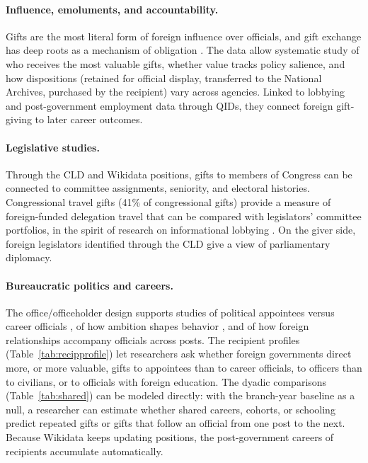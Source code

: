\documentclass[11pt]{article}
\begin{document}
\paragraph{Influence, emoluments, and accountability.} Gifts are the most literal form of foreign influence over officials, and gift exchange has deep roots as a mechanism of obligation \citep{mauss1990gift}. The data allow systematic study of who receives the most valuable gifts, whether value tracks policy salience, and how dispositions (retained for official display, transferred to the National Archives, purchased by the recipient) vary across agencies. Linked to lobbying and post-government employment data through QIDs, they connect foreign gift-giving to later career outcomes.

\paragraph{Legislative studies.} Through the CLD and Wikidata positions, gifts to members of Congress can be connected to committee assignments, seniority, and electoral histories. Congressional travel gifts (41\% of congressional gifts) provide a measure of foreign-funded delegation travel that can be compared with legislators' committee portfolios, in the spirit of research on informational lobbying \citep{hall2006lobbying}. On the giver side, foreign legislators identified through the CLD give a view of parliamentary diplomacy.

\paragraph{Bureaucratic politics and careers.} The office/officeholder design supports studies of political appointees versus career officials \citep{lewis2008politics}, of how ambition shapes behavior \citep{teodoro2011bureaucratic}, and of how foreign relationships accompany officials across posts. The recipient profiles (Table~\ref{tab:recipprofile}) let researchers ask whether foreign governments direct more, or more valuable, gifts to appointees than to career officials, to officers than to civilians, or to officials with foreign education. The dyadic comparisons (Table~\ref{tab:shared}) can be modeled directly: with the branch-year baseline as a null, a researcher can estimate whether shared careers, cohorts, or schooling predict repeated gifts or gifts that follow an official from one post to the next. Because Wikidata keeps updating positions, the post-government careers of recipients accumulate automatically.
\end{document}

